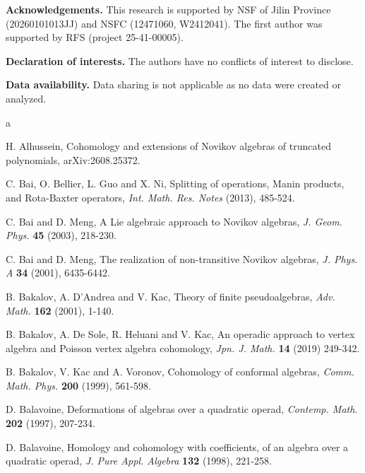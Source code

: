 \documentclass[12pt]{amsart}
\theoremstyle{definition}
\begin{document}
\noindent
{\bf Acknowledgements. } This research is supported by  NSF of Jilin Province (20260101013JJ) and NSFC (12471060, W2412041).  The first author was supported by RFS (project 25-41-00005).

\smallskip
\noindent
{\bf Declaration of interests. } The authors have no conflicts of interest to disclose.

\smallskip
\noindent
{\bf Data availability. } Data sharing is not applicable as no data were created or analyzed.

\begin{thebibliography}{a}


 H. Alhussein, Cohomology and extensions of Novikov algebras of truncated polynomials,  arXiv:2608.25372.

C. Bai, O. Bellier, L. Guo and X. Ni, Splitting of operations, Manin products, and Rota-Baxter operators, {\em Int. Math. Res. Notes} (2013), 485-524.

C. Bai and D. Meng, A Lie algebraic approach to Novikov algebras, \emph{J. Geom. Phys.} {\bf 45} (2003), 218-230.


C. Bai and D. Meng, The realization of non-transitive Novikov algebras, {\em J. Phys. A} {\bf 34} (2001), 6435-6442. %

B. Bakalov, A. D'Andrea and V. Kac, Theory of finite pseudoalgebras, {\em Adv. Math.} {\bf 162} (2001), 1-140.

B. Bakalov, A. De Sole, R. Heluani and V. Kac, An operadic approach to vertex algebra and Poisson vertex algebra cohomology, {\em Jpn. J. Math.} {\bf 14} (2019) 249-342.


B. Bakalov, V. Kac and A. Voronov, Cohomology of conformal algebras, {\em Comm. Math. Phys.} {\bf 200} (1999), 561-598.

D. Balavoine, Deformations of algebras over a quadratic operad, {\em Contemp. Math.} {\bf 202} (1997), 207-234.

D. Balavoine, Homology and cohomology with coefficients, of an algebra over a quadratic operad, {\em J. Pure Appl. Algebra} {\bf 132} (1998), 221-258.


\end{thebibliography}
\end{document}

